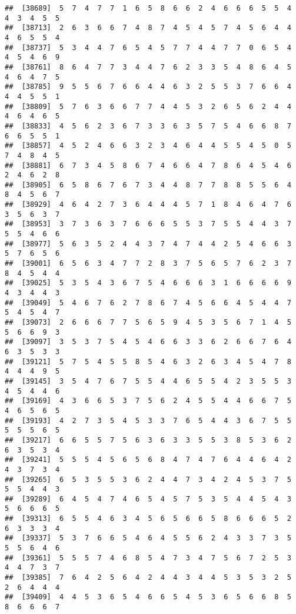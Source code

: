 \documentclass[
]{book}
\begin{document}
\begin{verbatim}
##  [38689]  5  7  4  7  7  1  6  5  8  6  6  2  4  6  6  6  5  5  4  4  3  4  5  5
##  [38713]  2  6  3  6  6  7  4  8  7  4  5  4  5  7  4  5  6  4  4  4  6  5  5  4
##  [38737]  5  3  4  4  7  6  5  4  5  7  7  4  4  7  7  0  6  5  4  4  5  4  6  9
##  [38761]  8  6  4  7  7  3  4  4  7  6  2  3  3  5  4  8  6  4  5  4  6  4  7  5
##  [38785]  9  5  5  6  7  6  6  4  4  6  3  2  5  5  3  7  6  6  4  4  4  5  5  1
##  [38809]  5  7  6  3  6  6  7  7  4  4  5  3  2  6  5  6  2  4  4  4  6  4  6  5
##  [38833]  4  5  6  2  3  6  7  3  3  6  3  5  7  5  4  6  6  8  7  6  6  5  5  1
##  [38857]  4  5  2  4  6  6  3  2  3  4  6  4  4  5  5  4  5  0  5  7  4  8  4  5
##  [38881]  6  7  3  4  5  8  6  7  4  6  6  4  7  8  6  4  5  4  6  2  4  6  2  8
##  [38905]  6  5  8  6  7  6  7  3  4  4  8  7  7  8  8  5  5  6  4  8  4  5  6  7
##  [38929]  4  6  4  2  7  3  6  4  4  4  5  7  1  8  4  6  4  7  6  3  5  6  3  7
##  [38953]  3  7  3  6  3  7  6  6  6  5  5  3  7  5  5  4  4  3  7  5  5  4  6  6
##  [38977]  5  6  3  5  2  4  4  3  7  4  7  4  4  2  5  4  6  6  3  5  7  6  5  6
##  [39001]  6  5  6  3  4  7  7  2  8  3  7  5  6  5  7  6  2  3  7  8  4  5  4  4
##  [39025]  5  3  5  4  3  6  7  5  4  6  6  6  3  1  6  6  6  6  9  4  3  4  4  3
##  [39049]  5  4  6  7  6  2  7  8  6  7  4  5  6  6  4  5  4  4  7  5  4  5  4  7
##  [39073]  2  6  6  6  7  7  5  6  5  9  4  5  3  5  6  7  1  4  5  5  6  6  9  3
##  [39097]  3  5  3  7  5  4  5  4  6  6  3  3  6  2  6  6  7  6  4  6  3  5  3  3
##  [39121]  5  7  5  4  5  5  8  5  4  6  3  2  6  3  4  5  4  7  8  4  4  4  9  5
##  [39145]  3  5  4  7  6  7  5  5  4  4  6  5  5  4  2  3  5  5  3  4  5  4  4  6
##  [39169]  4  3  6  6  5  3  7  5  6  2  4  5  5  4  4  6  6  7  5  4  6  5  6  5
##  [39193]  4  2  7  3  5  4  5  3  3  7  6  5  4  4  3  6  7  5  5  5  5  5  6  5
##  [39217]  6  6  5  5  7  5  6  3  6  3  3  5  5  3  8  5  3  6  2  6  3  5  3  4
##  [39241]  5  5  5  4  5  6  5  6  8  4  7  4  7  6  4  4  6  4  2  4  3  7  3  4
##  [39265]  6  5  3  5  5  3  6  2  4  4  7  3  4  2  4  5  3  7  5  5  5  4  4  3
##  [39289]  6  4  5  4  7  4  6  5  4  5  7  5  3  5  4  4  5  4  3  5  6  6  6  5
##  [39313]  6  5  5  4  6  3  4  5  6  5  6  6  5  8  6  6  6  5  2  6  3  3  3  4
##  [39337]  5  3  7  6  6  5  4  6  4  5  5  6  2  4  3  3  7  3  5  5  5  6  4  6
##  [39361]  5  5  5  7  4  6  8  5  4  7  3  4  7  5  6  7  2  5  3  4  4  7  3  7
##  [39385]  7  6  4  2  5  6  4  2  4  4  3  4  4  5  3  5  3  2  5  2  6  4  4  4
##  [39409]  4  4  5  3  6  5  4  6  6  5  4  5  3  6  5  6  6  8  5  8  6  6  6  7

\end{verbatim}
\end{document}
